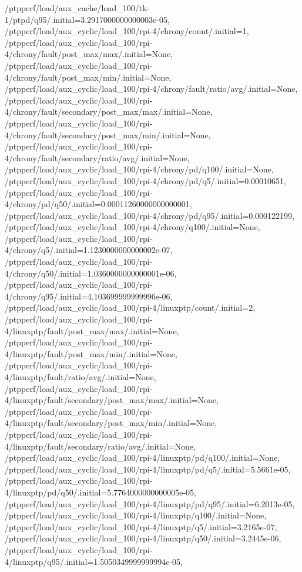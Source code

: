 {    /ptpperf/load/aux_cache/load_100/tk-1/ptpd/q95/.initial=3.2917000000000003e-05,
    /ptpperf/load/aux_cyclic/load_100/rpi-4/chrony/count/.initial=1,
    /ptpperf/load/aux_cyclic/load_100/rpi-4/chrony/fault/post_max/max/.initial=None,
    /ptpperf/load/aux_cyclic/load_100/rpi-4/chrony/fault/post_max/min/.initial=None,
    /ptpperf/load/aux_cyclic/load_100/rpi-4/chrony/fault/ratio/avg/.initial=None,
    /ptpperf/load/aux_cyclic/load_100/rpi-4/chrony/fault/secondary/post_max/max/.initial=None,
    /ptpperf/load/aux_cyclic/load_100/rpi-4/chrony/fault/secondary/post_max/min/.initial=None,
    /ptpperf/load/aux_cyclic/load_100/rpi-4/chrony/fault/secondary/ratio/avg/.initial=None,
    /ptpperf/load/aux_cyclic/load_100/rpi-4/chrony/pd/q100/.initial=None,
    /ptpperf/load/aux_cyclic/load_100/rpi-4/chrony/pd/q5/.initial=0.00010651,
    /ptpperf/load/aux_cyclic/load_100/rpi-4/chrony/pd/q50/.initial=0.00011260000000000001,
    /ptpperf/load/aux_cyclic/load_100/rpi-4/chrony/pd/q95/.initial=0.000122199,
    /ptpperf/load/aux_cyclic/load_100/rpi-4/chrony/q100/.initial=None,
    /ptpperf/load/aux_cyclic/load_100/rpi-4/chrony/q5/.initial=1.1230000000000002e-07,
    /ptpperf/load/aux_cyclic/load_100/rpi-4/chrony/q50/.initial=1.0360000000000001e-06,
    /ptpperf/load/aux_cyclic/load_100/rpi-4/chrony/q95/.initial=4.103699999999996e-06,
    /ptpperf/load/aux_cyclic/load_100/rpi-4/linuxptp/count/.initial=2,
    /ptpperf/load/aux_cyclic/load_100/rpi-4/linuxptp/fault/post_max/max/.initial=None,
    /ptpperf/load/aux_cyclic/load_100/rpi-4/linuxptp/fault/post_max/min/.initial=None,
    /ptpperf/load/aux_cyclic/load_100/rpi-4/linuxptp/fault/ratio/avg/.initial=None,
    /ptpperf/load/aux_cyclic/load_100/rpi-4/linuxptp/fault/secondary/post_max/max/.initial=None,
    /ptpperf/load/aux_cyclic/load_100/rpi-4/linuxptp/fault/secondary/post_max/min/.initial=None,
    /ptpperf/load/aux_cyclic/load_100/rpi-4/linuxptp/fault/secondary/ratio/avg/.initial=None,
    /ptpperf/load/aux_cyclic/load_100/rpi-4/linuxptp/pd/q100/.initial=None,
    /ptpperf/load/aux_cyclic/load_100/rpi-4/linuxptp/pd/q5/.initial=5.5661e-05,
    /ptpperf/load/aux_cyclic/load_100/rpi-4/linuxptp/pd/q50/.initial=5.7764000000000005e-05,
    /ptpperf/load/aux_cyclic/load_100/rpi-4/linuxptp/pd/q95/.initial=6.2013e-05,
    /ptpperf/load/aux_cyclic/load_100/rpi-4/linuxptp/q100/.initial=None,
    /ptpperf/load/aux_cyclic/load_100/rpi-4/linuxptp/q5/.initial=3.2165e-07,
    /ptpperf/load/aux_cyclic/load_100/rpi-4/linuxptp/q50/.initial=3.2445e-06,
    /ptpperf/load/aux_cyclic/load_100/rpi-4/linuxptp/q95/.initial=1.5050349999999994e-05,
}
